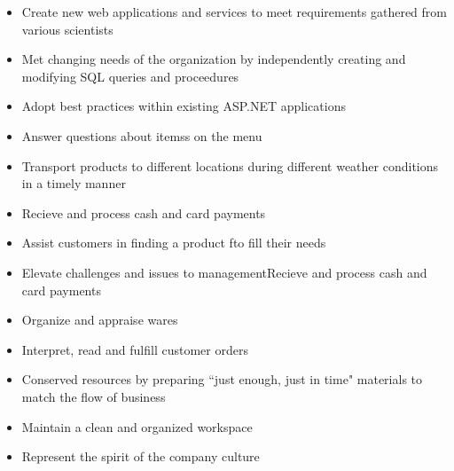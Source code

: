 \documentclass[10pt,a4paper,ragged2e,withhyper]{altacv}
\begin{document}
		\begin{paracol}{2}

		

			\cvtag{\LaTeX}

			\begin{itemize}
				\item Create new web applications and services to meet requirements gathered from various scientists
				\item Met changing needs of the organization by independently creating and modifying SQL queries and proceedures
				\item Adopt best practices within existing ASP.NET applications
			\end{itemize}
			\divider
			\begin{itemize}
				\item Answer questions about itemss on the menu
				\item Transport products to different locations during different weather conditions in a timely manner
				\item Recieve and process cash and card payments
			\end{itemize}
			\divider
			\begin{itemize}
				\item Assist customers in finding a product fto fill their needs
				\item Elevate challenges and issues to managementRecieve and process cash and card payments
				\item Organize and appraise wares
			\end{itemize}
			\divider
			\begin{itemize}
				\item Interpret, read and fulfill customer orders
				\item Conserved resources by preparing “just enough, just in time" materials to match the flow of business
				\item Maintain a clean and organized workspace
				\item Represent the spirit of the company culture
			\end{itemize}
			\medskip


\end{paracol}
\end{document}
